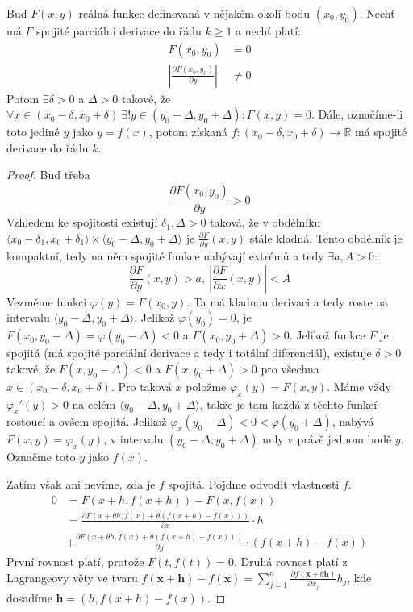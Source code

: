 \documentclass[../main.tex]{subfiles}
\begin{document}
\begin{theorem}
	Buď $F(x,y)$ reálná funkce definovaná v nějakém okolí bodu $(x_0, y_0)$. Nechť má $F$ spojité parciální
	derivace do řádu $k \geq 1$ a nechť platí:
	\begin{align*}
	    F(x_0, y_0) &= 0\\
	    \left| \frac{\partial F(x_0,y_0)}{\partial y} \right| &\neq 0
	\end{align*}
	Potom $ \exists \delta > 0$ a $\Delta > 0$ takové, že
	$\forall x \in (x_0 - \delta , x_0 + \delta)\ \exists! y \in (y_0 - \Delta , y_0 + \Delta): F(x,y) = 0$.
	Dále, označíme-li toto jediné $y$ jako $y = f(x)$, potom získaná
	$f: (x_0 - \delta , x_0 + \delta ) \to \mathbb{R}$ má spojité derivace do řádu $k$.
\end{theorem}

\begin{proof}
	Buď třeba
	$$
	\frac{\partial F(x_0, y_0)}{\partial y} > 0
	$$
	Vzhledem ke spojitosti existují $\delta_1, \Delta > 0$ taková, že v
	obdélníku $\langle x_0 - \delta_1, x_0 + \delta_1 \rangle \times
	\langle y_0 - \Delta, y_0 + \Delta \rangle$ je $\frac{\partial
	F}{\partial y} (x, y)$ stále kladná. Tento obdélník je kompaktní, tedy
	na něm spojité funkce nabývají extrémů a tedy
	$\exists a, A > 0:$
	\begin{equation} \label{eq:1}
		\frac{\partial F}{\partial y}(x, y) > a,~ \left |
		\frac{\partial F}{\partial x}(x, y) \right | < A
	\end{equation}
	Vezměme funkci $\varphi(y) = F(x_0, y)$. Ta má kladnou derivaci a tedy
	roste na intervalu $\langle y_0 - \Delta, y_0 + \Delta \rangle$.
	Jelikož $\varphi(y_0) = 0$, je $F(x_0, y_0 - \Delta) = \varphi(y_0 -
	\Delta) < 0$ a $F(x_0, y_0 + \Delta) > 0$. Jelikož funkce $F$ je
	spojitá (má spojité parciální derivace a tedy i totální diferenciál),
	existuje $\delta > 0$ takové, že $F(x, y_0 - \Delta) < 0$ a $F(x, y_0 +
	\Delta) > 0$ pro všechna $x \in (x_0 - \delta, x_0 + \delta)$. Pro
	taková $x$ položme $\varphi_x(y) = F(x, y)$. Máme vždy $\varphi_x'(y) >
	0$ na celém $\langle y_0 - \Delta, y_0 + \Delta \rangle$, takže je tam
	každá z těchto funkcí rostoucí a ovšem spojitá. Jelikož $\varphi_x(y_0
	- \Delta) < 0 < \varphi(y_0 + \Delta)$, nabývá $F(x, y) =
	\varphi_x(y)$, v intervalu $(y_0 - \Delta, y_0 + \Delta)$ nuly v právě
	jednom bodě $y$. Označme toto $y$ jako $f(x)$.

	Zatím však ani nevíme, zda je $f$ spojitá. Pojďme odvodit vlastnosti
	$f$.
	\begin{align*}
		0 &= F(x + h, f(x + h)) - F(x, f(x)) \\
		&= \frac{\partial F (x + \theta h, f(x) + \theta (f(x + h) -
		f(x)))}{\partial x} \cdot h \\
		&+ \frac{\partial F (x + \theta h, f(x) + \theta (f(x + h) -
		f(x)))}{\partial y} \cdot (f(x + h) - f(x))
	\end{align*}
	První rovnost platí, protože $F(t, f(t)) = 0$. Druhá rovnost platí z
	Lagrangeovy věty ve tvaru $f(\mathbf{x} + \mathbf{h}) - f(\mathbf{x}) =
	\sum_{j=1}^{n} \frac{\partial f(\mathbf{x} + \theta
	\mathbf{h})}{\partial x_j}h_j$, kde dosadíme $\mathbf{h} = (h, f(x + h)
	- f(x))$.


\end{proof}
\end{document}
